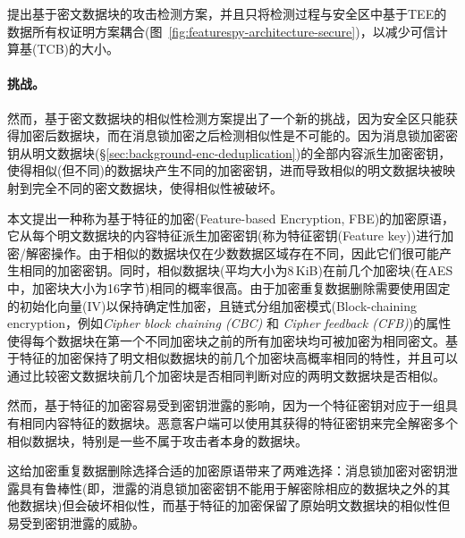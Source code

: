 \sysnameF 提出基于密文数据块的攻击检测方案，并且只将检测过程与安全区中基于TEE的数据所有权证明方案耦合(图~\ref{fig:featurespy-architecture-secure})，以减少可信计算基(TCB)的大小。

\paragraph*{挑战。}
然而，基于密文数据块的相似性检测方案提出了一个新的挑战，因为安全区只能获得加密后数据块，而在消息锁加密之后检测相似性是不可能的。因为消息锁加密密钥从明文数据块(\S\ref{sec:background-enc-deduplication})的全部内容派生加密密钥，使得相似(但不同)的数据块产生不同的加密密钥，进而导致相似的明文数据块被映射到完全不同的密文数据块，使得相似性被破坏。

本文提出一种称为基于特征的加密(Feature-based Encryption, FBE)的加密原语，它从每个明文数据块的内容特征派生加密密钥(称为特征密钥(Feature key))进行加密/解密操作。由于相似的数据块仅在少数数据区域存在不同，因此它们很可能产生相同的加密密钥。同时，相似数据块(平均大小为8\,KiB)在前几个加密块(在AES中，加密块大小为16字节)相同的概率很高。由于加密重复数据删除需要使用固定的初始化向量(IV)以保持确定性加密，且链式分组加密模式(Block-chaining encryption，例如\textit{Cipher block chaining (CBC)} 和 \textit{Cipher feedback (CFB)})的属性使得每个数据块在第一个不同加密块之前的所有加密块均可被加密为相同密文。基于特征的加密保持了明文相似数据块的前几个加密块高概率相同的特性，并且可以通过比较密文数据块前几个加密块是否相同判断对应的两明文数据块是否相似。

然而，基于特征的加密容易受到密钥泄露的影响，因为一个特征密钥对应于一组具有相同内容特征的数据块。恶意客户端可以使用其获得的特征密钥来完全解密多个相似数据块，特别是一些不属于攻击者本身的数据块。

这给加密重复数据删除选择合适的加密原语带来了两难选择：消息锁加密对密钥泄露具有鲁棒性(即，泄露的消息锁加密密钥不能用于解密除相应的数据块之外的其他数据块)但会破坏相似性，而基于特征的加密保留了原始明文数据块的相似性但易受到密钥泄露的威胁。
